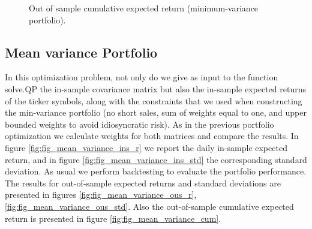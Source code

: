 \documentclass[letterpaper,12pt]{article}
\begin{document}
\begin{figure}
  \centering
  \caption{Out of sample cumulative expected return (minimum-variance portfolio).\label{fig:fig_min_variance_cum}}
\end{figure}

\subsection{Mean variance Portfolio}
In this optimization problem, not only do we give as input to the function solve.QP the in-sample covariance matrix but also the in-sample expected returns of the ticker symbols, along with the constraints that we used when constructing the min-variance portfolio (no short sales, sum of weights equal to one, and upper bounded weights to avoid idiosyncratic risk). As in the previous portfolio optimization we calculate weights for both matrices and compare the results. In figure \ref{fig:fig_mean_variance_ins_r} we report the daily in-sample expected return, and in figure \ref{fig:fig_mean_variance_ins_std} the corresponding standard deviation. As usual we perform backtesting to evaluate the portfolio performance. The results for out-of-sample expected returns and standard deviations are presented in figures \ref{fig:fig_mean_variance_ous_r}, \ref{fig:fig_mean_variance_ous_std}. Also the out-of-sample cumulative expected return is presented in figure \ref{fig:fig_mean_variance_cum}.
\end{document}
